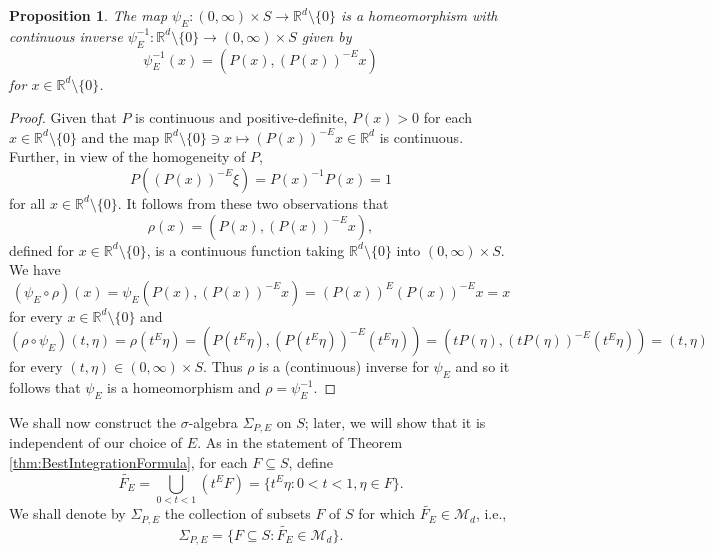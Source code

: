\documentclass[11pt]{article}
\newtheorem{proposition}[theorem]{Proposition}
\begin{document}
\begin{proposition}\label{prop:PsiHomeomorphism}
The map $\psi_E:(0,\infty)\times S\to\mathbb{R}^d\setminus\{0\}$ is a homeomorphism with continuous inverse $\psi_E^{-1}:\mathbb{R}^d\setminus\{0\}\to (0,\infty)\times S$ given by
\begin{equation*}
\psi_E^{-1}(x)=(P(x),(P(x))^{-E}x)
\end{equation*}
for $x\in\mathbb{R}^d\setminus\{0\}$.
\end{proposition}

\begin{proof}
Given that $P$ is continuous and positive-definite, $P(x)>0$ for each $x\in \mathbb{R}^d\setminus\{0\}$ and the map $\mathbb{R}^d\setminus\{0\}\ni x \mapsto (P(x))^{-E}x\in \mathbb{R}^d$ is continuous. Further, in view of the homogeneity of $P$,
\begin{equation*}
P\left((P(x))^{-E}\xi\right)=P(x)^{-1}P(x)=1
\end{equation*}
for all $x\in\mathbb{R}^d\setminus\{0\}$. It follows from these two observations that
\begin{equation*}
\rho(x)=(P(x),(P(x))^{-E}x),
\end{equation*}
defined for $x\in\mathbb{R}^d\setminus\{0\}$, is a continuous function taking $\mathbb{R}^d\setminus\{0\}$ into $(0,\infty)\times S$. We have
\begin{equation*}
(\psi_E\circ \rho)(x)=\psi_E(P(x),(P(x))^{-E}x)=(P(x))^{E}(P(x))^{-E}x=x
\end{equation*}
for every $x\in \mathbb{R}^d\setminus \{0\}$ and
\begin{equation*}
(\rho\circ\psi_E)(t,\eta)=\rho(t^E\eta)=(P(t^{E}\eta),(P(t^{E}\eta))^{-E}(t^E\eta))=(tP(\eta),(tP(\eta))^{-E}(t^{E}\eta))=(t,\eta)
\end{equation*}
for every $(t,\eta)\in (0,\infty)\times S$. Thus $\rho$ is a (continuous) inverse for $\psi_E$ and so it follows that $\psi_E$ is a homeomorphism and $\rho=\psi_E^{-1}$.
\end{proof}



\noindent We shall now construct the $\sigma$-algebra $\Sigma_{P,E}$ on $S$; later, we will show that it is independent of our choice of $E$. As in the statement of Theorem \ref{thm:BestIntegrationFormula}, for each $F\subseteq S$, define
\begin{equation*}
\widetilde{F_E}=\bigcup_{0<t<1}\left(t^E F\right)=\{t^E\eta:0<t<1,\eta\in F\}. 
\end{equation*}
We shall denote by $\Sigma_{P,E}$ the collection of subsets $F$ of $S$ for which $\widetilde{F_E}\in\mathcal{M}_d$, i.e.,  
\begin{equation*}
\Sigma_{P,E}=\{F\subseteq S:\widetilde{F_E}\in\mathcal{M}_d\}.
\end{equation*}
\end{document}

